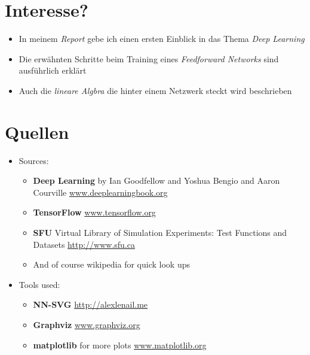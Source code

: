 \documentclass[t]{beamer}
\begin{document}
\section{Interesse?}
\begin{frame}
    \begin{itemize}
        \item In meinem \emph{Report} gebe ich einen ersten Einblick in das Thema \emph{Deep Learning} \newline
        \item Die erwähnten Schritte beim Training eines \emph{Feedforward Networks} sind ausführlich erklärt \newline
        \item Auch die \emph{lineare Algbra} die hinter einem Netzwerk steckt wird beschrieben
    \end{itemize}
\end{frame}

\section{Quellen}
\begin{frame}
    \begin{itemize}
        \item Sources:
        \begin{itemize}
            \item \textbf{Deep Learning} by Ian Goodfellow and Yoshua Bengio and Aaron Courville \newline
            \href{https://www.deeplearningbook.org}{www.deeplearningbook.org}
            \item \textbf{TensorFlow} \newline
            \href{https://www.tensorflow.org}{www.tensorflow.org}
            \item \textbf{SFU} Virtual Library of Simulation Experiments: Test Functions and Datasets \newline
            \href{http://www.sfu.ca/~ssurjano/camel6.html}{http://www.sfu.ca}
            \item And of course wikipedia for quick look ups \newline
        \end{itemize}
        \item Tools used:
        \begin{itemize}
            \item \textbf{NN-SVG} \newline
            \href{http://alexlenail.me/NN-SVG/index.html}{http://alexlenail.me}
            \item \textbf{Graphviz} \newline
            \href{https://graphviz.org}{www.graphviz.org}
            \item \textbf{matplotlib} for more plots \newline
            \href{https://matplotlib.org}{www.matplotlib.org}
        \end{itemize}
    \end{itemize}
\end{frame}
\end{document}
